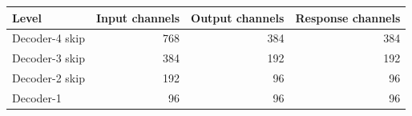 \begin{tabular}{lrrr}
\hline
Level & Input channels & Output channels & Response channels \\
\hline
Decoder-4 skip & 768 & 384 & 384 \\
Decoder-3 skip & 384 & 192 & 192 \\
Decoder-2 skip & 192 & 96 & 96 \\
Decoder-1 & 96 & 96 & 96 \\
\hline
\end{tabular}
